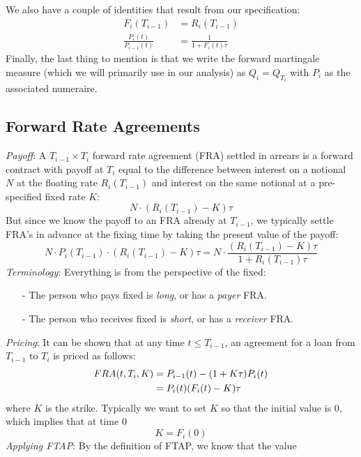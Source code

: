 \documentclass[a4paper,12pt]{scrartcl}
\begin{document}
We also have a couple of identities that result from our specification:
\begin{align*}
   F_i(T_{i-1}) &= R_i(T_{i-1})\\
   \frac{P_i(t)}{P_{i-1}(t)} &= \frac{1}{1+F_i(t)\tau}
\end{align*}
Finally, the last thing to mention is that we write the forward
martingale measure (which we will primarily use in our analysis)
as $Q_i = Q_{T_i}$ with $P_i$ as the associated numeraire.

\newpage

\subsection{Forward Rate Agreements}

{\sl Payoff}: A $T_{i-1} \times T_i$ forward rate agreement (FRA)
settled in arrears is a forward contract with payoff at $T_i$ equal
to the difference between interest on a notional $N$ at the floating
rate $R_i(T_{i-1})$ and interest on the same notional at a pre-specified
fixed rate $K$:
   \[ N\cdot (R_i(T_{i-1}) - K) \tau \]
But since we know the payoff to an FRA already at $T_{i-1}$, 
we typically
settle FRA's in advance at the fixing time by taking the present value
of the payoff:
\begin{equation}
   \label{frainit}
    N \cdot P_i(T_{i-1}) \cdot (R_i(T_{i-1}) - K)\tau = 
      N\cdot \frac{(R_i(T_{i-1}) - K)\tau}{1+R_i(T_{i-1})\tau}
\end{equation}
{\sl Terminology}: Everything is from the perspective of the fixed:
\begin{itemize}
   \item[-] The person who pays fixed is \emph{long}, or has a 
      \emph{payer} FRA.
   \item[-] The person who receives fixed is \emph{short}, or has a 
      \emph{receiver} FRA.
\end{itemize}
{\sl Pricing}:
It can be shown that at any time $t \leq T_{i-1}$, an agreement 
for a loan from $T_{i-1}$ to $T_{i}$ is priced as follows:
\begin{align}
   \label{fra1}
    FRA(t,T_i,K) &= P_{i-1}(t) - (1+K\tau)P_i(t) \notag\\
    &= P_i(t)(F_i(t) - K) \tau
\end{align}
where $K$ is the strike. Typically we want to set $K$ so that the initial
value is 0, which implies that at time 0
   \[ K = F_i(0) \]
{\sl Applying FTAP}: By the definition of FTAP, we know that the value
\end{document}
